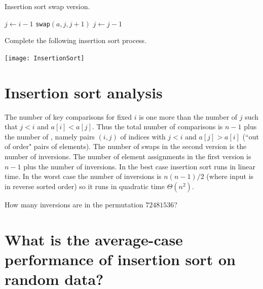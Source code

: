 \begin{algorithm}[H]
  \caption{Insertion sort swap version.}
    \label{alg:insort2}
\begin{algorithmic}[1]
		\State $j \gets i - 1$
			\State {}
			\State \texttt{swap}$(a,j,j+1)$
			\State $j \gets j - 1$
		\EndWhile
	\EndFor
	\State {}
\EndFunction  
\end{algorithmic}
\end{algorithm}

\begin{Boxample}[0]
Complete the following insertion sort process.
\begin{center}
\texttt{[image: InsertionSort]}
\end{center}
\end{Boxample}


\section{Insertion sort analysis}
The number of key comparisons for fixed $i$ is one more than the number of $j$ such that $j < i$ and $a[i] < a[j]$.
Thus the total number of comparisons is $n-1$ plus the number of , 
namely pairs $(i, j)$ of indices with $j < i$ and $a[j] > a[i]$ (``out of order" pairs of elements).
The number of swaps in the second version is the number of inversions. 
The number of element assignments in the first version is $n-1$ plus the number of inversions.
In the best case insertion sort runs in linear time. 
In the worst case the number of inversions is $n(n-1)/2$ 
(where input is in reverse sorted order) so it runs in quadratic time $\Theta(n^2)$.

\begin{Boxample}[4]
How many inversions are in the permutation $72481536$?
\end{Boxample}

\section{What is the average-case performance of insertion sort on random data?}

